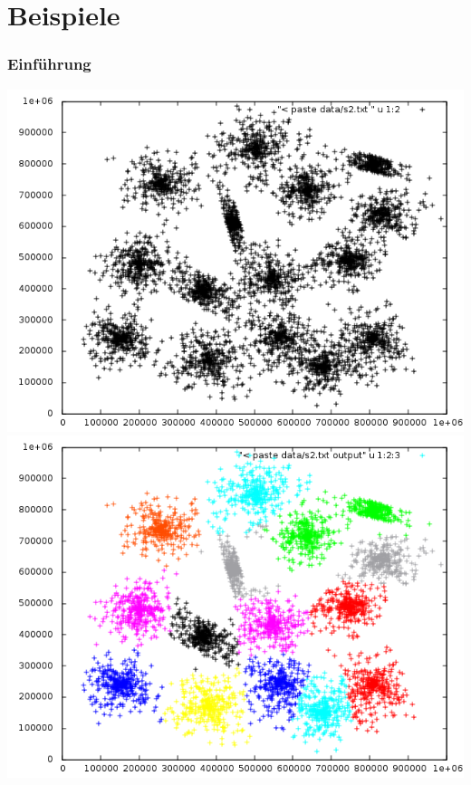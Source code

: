 \documentclass[10pt]{beamer}
\begin{document}
\section{Beispiele}
\begin{frame}
	\frametitle{Einf\"uhrung}
	\includegraphics[scale=0.34, keepaspectratio]{pics/s2_black.png}
	\includegraphics[scale=0.34, keepaspectratio]{pics/s2_colored.png}
\end{frame}
\end{document}
